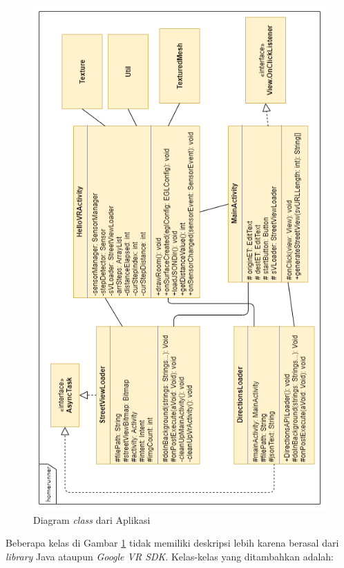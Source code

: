 \begin{figure}[h]
	\centering
		\includegraphics[scale=1]{Gambar/class-diagram.png}
	\caption{Diagram \textit{class} dari Aplikasi}
	\label{fig:class-diagram}
\end{figure}

Beberapa kelas di Gambar \ref{fig:class-diagram} tidak memiliki deskripsi lebih karena berasal dari \textit{library} Java ataupun \textit{Google VR SDK}. Kelas-kelas yang ditambahkan adalah:

